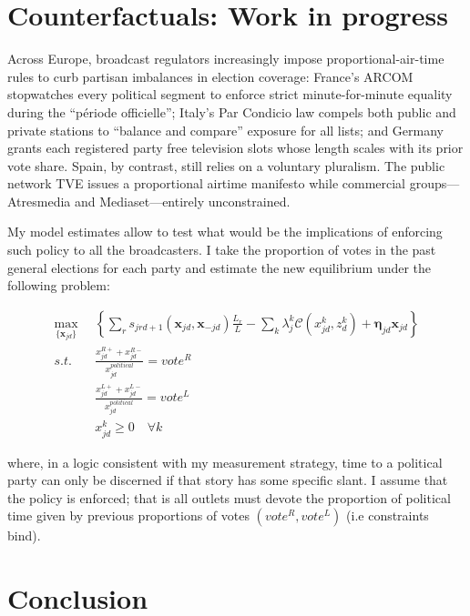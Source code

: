 \documentclass[12pt]{article}
\begin{document}
\section{Counterfactuals: Work in progress}

\label{sec:counter}


Across Europe, broadcast regulators increasingly impose proportional-air-time rules to curb partisan imbalances in election coverage: France’s ARCOM stopwatches every political segment to enforce strict minute-for-minute equality during the “période officielle”; Italy’s Par Condicio law compels both public and private stations to “balance and compare” exposure for all lists; and Germany grants each registered party free television slots whose length scales with its prior vote share. Spain, by contrast, still relies on a voluntary pluralism. The public network TVE issues a proportional airtime manifesto while commercial groups—Atresmedia and Mediaset—entirely unconstrained. 

My model estimates allow to test what would be the implications of enforcing such policy to all the broadcasters.  I take the proportion of votes in the past general elections for each party and estimate the new equilibrium under the following problem: 



\begin{equation}\label{eq:payoffs2}
	\begin{aligned}
		\max_{\{\mathbf{x}_{jd}\}}   & \left\{   \sum_{r}s_{jrd+1}(\bm{x}_{jd}, \bm{x}_{-jd})\frac{L_r}{L} - \sum_k {\lambda_j^k}\mathcal{C}({x}^k_{jd}, {z}^k_d)+ \bm{\eta}_{jd}\bm{x}_{jd} \right\}\\
		s.t.   \quad &   \frac{x_{jd}^{R+} + x_{jd}^{R-} }{x_{jd}^{political}}=vote^R\\
		&  \frac{x_{jd}^{L+} + x_{jd}^{L-} }{x_{jd}^{political}}= vote^L\\
		& x_{jd}^k \geq 0 \quad \forall k
	\end{aligned}
\end{equation} 


where, in a logic consistent with my measurement strategy, time to a political party can only be discerned if that story has some specific slant. I assume that the policy is enforced; that is all outlets must devote the proportion of political time given by previous proportions of votes $(vote^R, vote^L)$ (i.e constraints bind). 



	
	\section{Conclusion}
	
\end{document}
